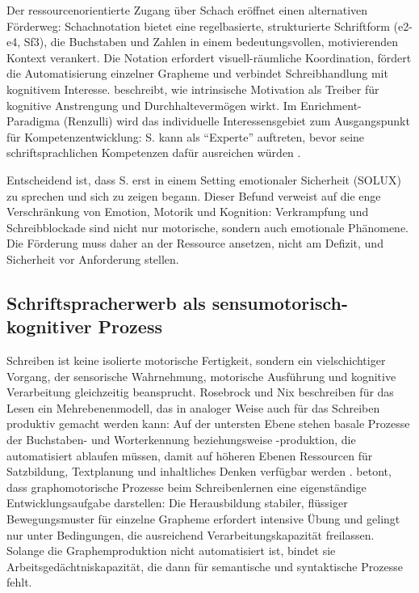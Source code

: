 \documentclass[ngerman, a4paper]{article}
\begin{document}
Der ressourcenorientierte Zugang über Schach eröffnet einen alternativen Förderweg:
Schachnotation bietet eine regelbasierte, strukturierte Schriftform (e2-e4, Sf3), die
Buchstaben und Zahlen in einem bedeutungsvollen, motivierenden Kontext verankert.
Die Notation erfordert visuell-räumliche Koordination, fördert die Automatisierung
einzelner Grapheme und verbindet Schreibhandlung mit kognitivem Interesse.
\textcite{lehwald2017motivation} beschreibt, wie intrinsische Motivation als Treiber für kognitive Anstrengung
und Durchhaltevermögen wirkt. Im Enrichment-Paradigma
(Renzulli) wird das individuelle Interessensgebiet zum Ausgangspunkt für
Kompetenzentwicklung: S. kann als \enquote{Experte} auftreten, bevor seine schriftsprachlichen
Kompetenzen dafür ausreichen würden
\parencite{fischer2020begabungsfoerderung,muelleroppliger2021handbuch}.
 
Entscheidend ist, dass S. erst in einem Setting emotionaler Sicherheit (SOLUX) zu
sprechen und sich zu zeigen begann. Dieser Befund verweist auf die enge Verschränkung
von Emotion, Motorik und Kognition: Verkrampfung und Schreibblockade sind nicht nur
motorische, sondern auch emotionale Phänomene. Die Förderung muss daher an der
Ressource ansetzen, nicht am Defizit, und Sicherheit vor Anforderung stellen.


\subsection{Schriftspracherwerb als sensumotorisch-kognitiver Prozess}

Schreiben ist keine isolierte motorische Fertigkeit, sondern ein vielschichtiger Vorgang,
der sensorische Wahrnehmung, motorische Ausführung und kognitive Verarbeitung
gleichzeitig beansprucht. Rosebrock und Nix beschreiben für das Lesen ein
Mehrebenenmodell, das in analoger Weise auch für das Schreiben produktiv gemacht werden
kann: Auf der untersten Ebene stehen basale Prozesse der Buchstaben- und Worterkennung
beziehungsweise -produktion, die automatisiert ablaufen müssen, damit auf höheren Ebenen
Ressourcen für Satzbildung, Textplanung und inhaltliches Denken verfügbar werden
\parencite{rosebrock2010grundlagen}. \textcite{sturm2016graphomotorik} betont, dass graphomotorische Prozesse beim
Schreibenlernen eine eigenständige Entwicklungsaufgabe darstellen: Die Herausbildung
stabiler, flüssiger Bewegungsmuster für einzelne Grapheme erfordert intensive Übung
und gelingt nur unter Bedingungen, die ausreichend Verarbeitungskapazität freilassen.
Solange die Graphemproduktion nicht automatisiert ist,
bindet sie Arbeitsgedächtniskapazität, die dann für semantische und syntaktische Prozesse
fehlt.
\end{document}
